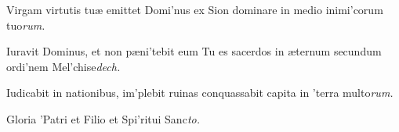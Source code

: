 \documentclass[initial=ZallmanCaps,staff=19,font=greciliae,11pt,a4paper,openany,twoside,choralsign=PfefferMediaeval]{gregorian}
\begin{document}
\newpage
{}
\par
\vskip9mm
\begin{multicols}{2}\setlength{\columnseprule}{0.2px}
Virgam virtutis tuæ emittet Domi'nus ex Sion \grestar{} dominare in medio inimi'corum tuo\textit{rum.}\par
{}\par
Iuravit Dominus, et non pæni'tebit eum \grestar{} Tu es sacerdos in æternum secundum ordi'nem Mel'chise\textit{dech.}\par
{}\par
Iudicabit in nationibus, im'plebit ruinas \grestar{} conquassabit capita in 'terra multo\textit{rum.}\par
{}\par
Gloria 'Patri et Filio \grestar{} et Spi'ritui Sanc\textit{to.}\par
{}
\end{multicols}\par
\end{document}
